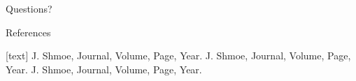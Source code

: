 \documentclass[xcolor=x11names,compress]{beamer}
\renewcommand{\(}{\begin{columns}}
\renewcommand{\)}{\end{columns}}
\newcommand{\<}[1]{\begin{column}{#1}}
\renewcommand{\>}{\end{column}}
\begin{document}
\begin{frame}[plain,c]
\begin{center}
Questions?
\end{center}
\end{frame}


\begin{frame}{References}    
  \begin{thebibliography}{10}    
  [text]
   J. Shmoe, Journal, Volume, Page, Year.
   J. Shmoe, Journal, Volume, Page, Year.
   J. Shmoe, Journal, Volume, Page, Year.
  \end{thebibliography}
\end{frame}
\end{document}
